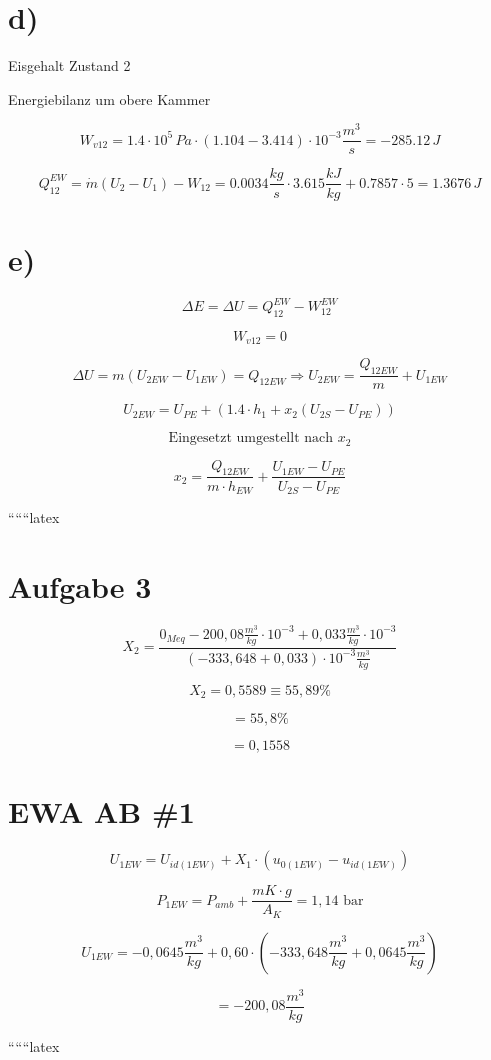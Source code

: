 

\section*{d)}

Eisgehalt Zustand 2

Energiebilanz um obere Kammer

\[
W_{v12} = 1.4 \cdot 10^5 \, Pa \cdot (1.104 - 3.414) \cdot 10^{-3} \frac{m^3}{s} = -285.12 \, J
\]

\[
Q_{12}^{EW} = \dot{m} (U_2 - U_1) - W_{12} = 0.0034 \frac{kg}{s} \cdot 3.615 \frac{kJ}{kg} + 0.7857 \cdot 5 = 1.3676 \, J
\]

\section*{e)}

\[
\Delta E = \Delta U = Q_{12}^{EW} - W_{12}^{EW}
\]

\[
W_{v12} = 0
\]

\[
\Delta U = m (U_{2EW} - U_{1EW}) = Q_{12EW} \Rightarrow U_{2EW} = \frac{Q_{12EW}}{m} + U_{1EW}
\]

\[
U_{2EW} = U_{PE} + (1.4 \cdot h_1 + x_2 (U_{2S} - U_{PE}))
\]

\[
\text{Eingesetzt umgestellt nach } x_2
\]

\[
x_2 = \frac{Q_{12EW}}{m \cdot h_{EW}} + \frac{U_{1EW} - U_{PE}}{U_{2S} - U_{PE}}
\]

``````latex


\section*{Aufgabe 3}

\[
X_2 = \frac{0_{Meq} - 200,08 \frac{m^3}{kg} \cdot 10^{-3} + 0,033 \frac{m^3}{kg} \cdot 10^{-3}}{(-333,648 + 0,033) \cdot 10^{-3} \frac{m^3}{kg}}
\]

\[
X_2 = 0,5589 \equiv 55,89\%
\]

\[
= 55,8\%
\]

\[
= 0,1558
\]

\section*{EWA AB \#1}

\[
U_{1EW} = U_{id(1EW)} + X_1 \cdot (u_{0(1EW)} - u_{id(1EW)})
\]

\[
P_{1EW} = P_{amb} + \frac{mK \cdot g}{A_K} = 1,14 \text{ bar}
\]

\[
U_{1EW} = -0,0645 \frac{m^3}{kg} + 0,60 \cdot (-333,648 \frac{m^3}{kg} + 0,0645 \frac{m^3}{kg})
\]

\[
= -200,08 \frac{m^3}{kg}
\]

``````latex